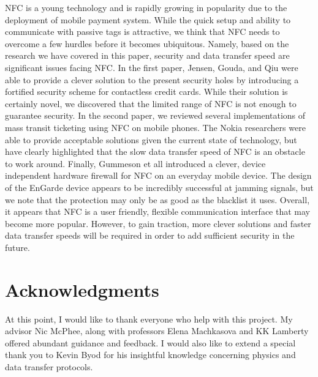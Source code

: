 \documentclass{sig-alternate}
\begin{document}
NFC is a young technology and is rapidly growing in popularity due to the deployment of mobile payment system. While the quick setup and ability to communicate with passive tags is attractive, we think that NFC needs to overcome a few hurdles before it becomes ubiquitous. Namely, based on the research we have covered in this paper, security and data transfer speed are significant issues facing NFC. In the first paper, Jensen, Gouda, and Qiu were able to provide a clever solution to the present security holes by introducing a fortified security scheme for contactless credit cards. While their solution is certainly novel, we discovered that the limited range of NFC is not enough to guarantee security. In the second paper, we reviewed several implementations of mass transit ticketing using NFC on mobile phones. The Nokia researchers were able to provide acceptable solutions given the current state of technology, but have clearly highlighted that the slow data transfer speed of NFC is an obstacle to work around. Finally, Gummeson et all introduced a clever, device independent hardware firewall for NFC on an everyday mobile device. The design of the EnGarde device appears to be incredibly successful at jamming signals, but we note that the protection may only be as good as the blacklist it uses. Overall, it appears that NFC is a user friendly, flexible communication interface that may become more popular. However, to gain traction, more clever solutions and faster data transfer speeds will be required in order to add sufficient security in the future.

\section*{Acknowledgments}
\label{sec:acknowledgments}


At this point, I would like to thank everyone who help with this project. My advisor Nic McPhee, along with professors Elena Machkasova and KK Lamberty offered abundant guidance and feedback. I would also like to extend a special thank you to Kevin Byod for his insightful knowledge  concerning physics and data transfer protocols.



\end{document}
